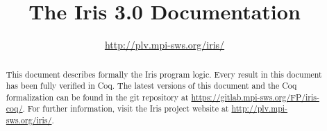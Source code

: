 \documentclass[10pt]{article}
\title{\bfseries The Iris 3.0 Documentation}
\author{\url{http://plv.mpi-sws.org/iris/}}
\begin{document}
\maketitle
\thispagestyle{empty}
\vfill
\begin{abstract}
This document describes formally the Iris program logic.
Every result in this document has been fully verified in Coq.
The latest versions of this document and the Coq formalization can be found in the git repository at \url{https://gitlab.mpi-sws.org/FP/iris-coq/}.
For further information, visit the Iris project website at \url{http://plv.mpi-sws.org/iris/}.
\end{abstract}

\clearpage
\tableofcontents

\clearpage\begingroup

\endgroup\clearpage\begingroup

\endgroup\clearpage\begingroup

\endgroup\clearpage\begingroup

\endgroup\clearpage\begingroup

\endgroup\clearpage\begingroup

\endgroup\clearpage\begingroup

\endgroup\clearpage\begingroup

\endgroup\clearpage\begingroup
\printbibliography
\endgroup
\end{document}
